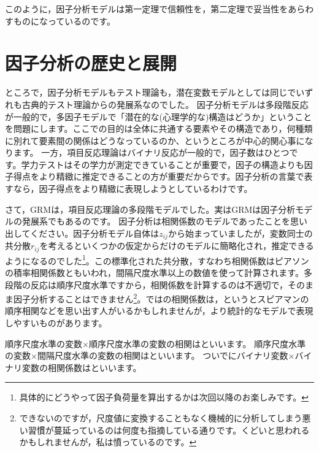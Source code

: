 \documentclass{ltjsbook}
\begin{document}
このように，因子分析モデルは第一定理で信頼性を，第二定理で妥当性をあらわすものになっているのです。


\section{因子分析の歴史と展開}

ところで，因子分析モデルもテスト理論も，潜在変数モデルとしては同じでいずれも古典的テスト理論からの発展系なのでした。
因子分析モデルは多段階反応が一般的で，多因子モデルで「潜在的な(心理学的な)構造はどうか」ということを問題にします。ここでの目的は全体に共通する要素やその構造であり，何種類に別れて要素間の関係はどうなっているのか、というところが中心的関心事になります。
一方，項目反応理論はバイナリ反応が一般的で，因子数はひとつです。学力テストはその学力が測定できていることが重要で，因子の構造よりも因子得点をより精緻に推定できることの方が重要だからです。因子分析の言葉で表すなら，因子得点をより精緻に表現しようとしているわけです。

さて，GRMは，項目反応理論の多段階モデルでした。実はGRMは因子分析モデルの発展系でもあるのです。
因子分析は相関係数のモデルであったことを思い出してください。因子分析モデル自体は$z_{ij}$から始まっていましたが，変数同士の共分散$r_{ij}$を考えるといくつかの仮定からだけのモデルに簡略化され，推定できるようになるのでした\footnote{具体的にどうやって因子負荷量を算出するかは次回以降のお楽しみです。}。この標準化された共分散，すなわち相関係数はピアソンの積率相関係数ともいわれ，間隔尺度水準以上の数値を使って計算されます。多段階の反応は順序尺度水準ですから，相関係数を計算するのは不適切で，そのまま因子分析することはできません\footnote{できないのですが，尺度値に変換することもなく機械的に分析してしまう悪い習慣が蔓延っているのは何度も指摘している通りです。くどいと思われるかもしれませんが，私は憤っているのです。}。ではの相関係数は，というとスピアマンの順序相関などを思い出す人がいるかもしれませんが，より統計的なモデルで表現しやすいものがあります。

順序尺度水準の変数$\times$順序尺度水準の変数の相関はといいます。
順序尺度水準の変数$\times$間隔尺度水準の変数の相関はといいます。
ついでにバイナリ変数$\times$バイナリ変数の相関係数はといいます。
\end{document}
